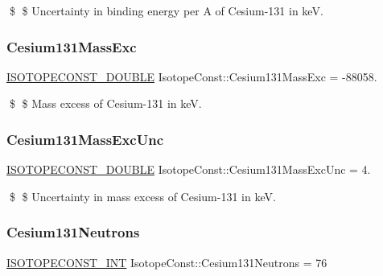 \$ \$ Uncertainty in binding energy per A of Cesium-\/131 in keV. \mbox{\label{group___isotope_const-_cesium-_cs131_ga1746d23d6d5f3cfed682883fd28ddfd0}} 
\subsubsection{\texorpdfstring{Cesium131\+Mass\+Exc}{Cesium131MassExc}}
{\footnotesize\ttfamily \mbox{\hyperlink{group___isotope_const-_macros_ga8f45a7272ce02c0b4c65c44636ed719a}{I\+S\+O\+T\+O\+P\+E\+C\+O\+N\+S\+T\+\_\+\+D\+O\+U\+B\+LE}} Isotope\+Const\+::\+Cesium131\+Mass\+Exc = -\/88058.}

\$ \$ Mass excess of Cesium-\/131 in keV. \mbox{\label{group___isotope_const-_cesium-_cs131_gad4a09eff8972bde6a41bf58b260e1c76}} 
\subsubsection{\texorpdfstring{Cesium131\+Mass\+Exc\+Unc}{Cesium131MassExcUnc}}
{\footnotesize\ttfamily \mbox{\hyperlink{group___isotope_const-_macros_ga8f45a7272ce02c0b4c65c44636ed719a}{I\+S\+O\+T\+O\+P\+E\+C\+O\+N\+S\+T\+\_\+\+D\+O\+U\+B\+LE}} Isotope\+Const\+::\+Cesium131\+Mass\+Exc\+Unc = 4.}

\$ \$ Uncertainty in mass excess of Cesium-\/131 in keV. \mbox{\label{group___isotope_const-_cesium-_cs131_ga6cca3a47bf2570813c1dfd5fdf6976a1}} 
\subsubsection{\texorpdfstring{Cesium131\+Neutrons}{Cesium131Neutrons}}
{\footnotesize\ttfamily \mbox{\hyperlink{group___isotope_const-_macros_ga5f18360b3e99483a35c32d789e62621c}{I\+S\+O\+T\+O\+P\+E\+C\+O\+N\+S\+T\+\_\+\+I\+NT}} Isotope\+Const\+::\+Cesium131\+Neutrons = 76}

